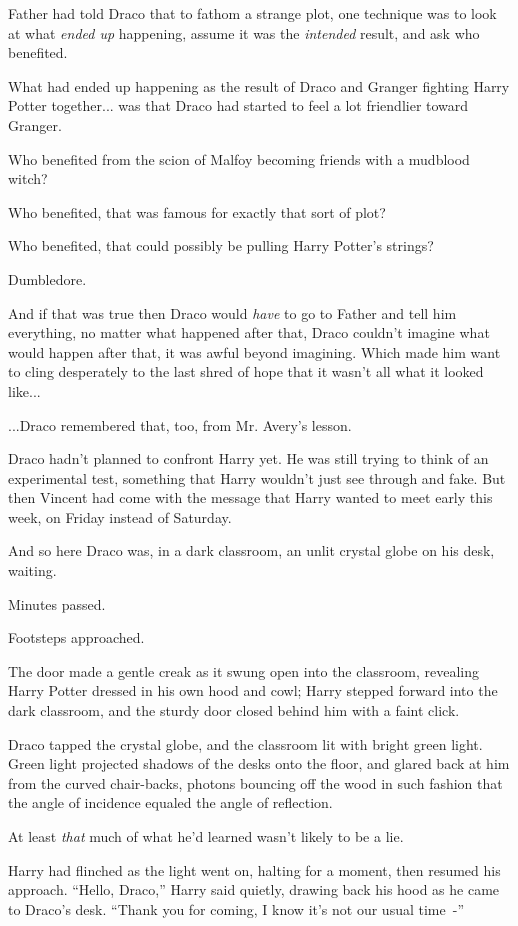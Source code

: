 Father had told Draco that to fathom a strange plot, one technique was to look at what \emph{ended up} happening, assume it was the \emph{intended} result, and ask who benefited.

What had ended up happening as the result of Draco and Granger fighting Harry Potter together... was that Draco had started to feel a lot friendlier toward Granger.

Who benefited from the scion of Malfoy becoming friends with a mudblood witch?

Who benefited, that was famous for exactly that sort of plot?

Who benefited, that could possibly be pulling Harry Potter's strings?

Dumbledore.

And if that was true then Draco would \emph{have} to go to Father and tell him everything, no matter what happened after that, Draco couldn't imagine what would happen after that, it was awful beyond imagining. Which made him want to cling desperately to the last shred of hope that it wasn't all what it looked like...

...Draco remembered that, too, from Mr. Avery's lesson.

Draco hadn't planned to confront Harry yet. He was still trying to think of an experimental test, something that Harry wouldn't just see through and fake. But then Vincent had come with the message that Harry wanted to meet early this week, on Friday instead of Saturday.

And so here Draco was, in a dark classroom, an unlit crystal globe on his desk, waiting.

Minutes passed.

Footsteps approached.

The door made a gentle creak as it swung open into the classroom, revealing Harry Potter dressed in his own hood and cowl; Harry stepped forward into the dark classroom, and the sturdy door closed behind him with a faint click.

Draco tapped the crystal globe, and the classroom lit with bright green light. Green light projected shadows of the desks onto the floor, and glared back at him from the curved chair-backs, photons bouncing off the wood in such fashion that the angle of incidence equaled the angle of reflection.

At least \emph{that} much of what he'd learned wasn't likely to be a lie.

Harry had flinched as the light went on, halting for a moment, then resumed his approach. ``Hello, Draco,'' Harry said quietly, drawing back his hood as he came to Draco's desk. ``Thank you for coming, I know it's not our usual time~-''

